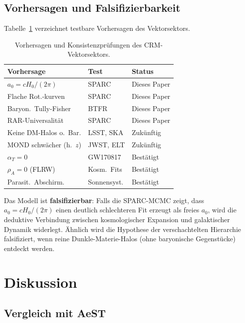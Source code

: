 \documentclass[aps,prd,twocolumn,superscriptaddress,nofootinbib]{revtex4-2}
\begin{document}
\subsection{Vorhersagen und Falsifizierbarkeit}

Tabelle~\ref{tab:predictions} verzeichnet testbare Vorhersagen des Vektorsektors.

\begin{table}[tbp]
\caption{\label{tab:predictions}Vorhersagen und Konsistenzpr\"ufungen des CRM-Vektorsektors.}
\begin{ruledtabular}
\small
\begin{tabular}{lll}
Vorhersage & Test & Status \\
\hline
$a_0 = cH_0/(2\pi)$ & SPARC & Dieses Paper \\
Flache Rot.-kurven & SPARC & Dieses Paper \\
Baryon.\ Tully-Fisher & BTFR & Dieses Paper \\
RAR-Universalit\"at & SPARC & Dieses Paper \\
Keine DM-Halos o.\ Bar. & LSST, SKA & Zuk\"unftig \\
MOND schw\"acher (h.\ $z$) & JWST, ELT & Zuk\"unftig \\
$\alpha_T = 0$ & GW170817 & Best\"atigt \\
$\rho_A = 0$ (FLRW) & Kosm.\ Fits & Best\"atigt \\
Parasit.\ Abschirm. & Sonnensyst. & Best\"atigt \\
\end{tabular}
\end{ruledtabular}
\end{table}

Das Modell ist \textbf{falsifizierbar}: Falls die SPARC-MCMC zeigt, dass $a_0 = cH_0/(2\pi)$ einen deutlich schlechteren Fit erzeugt als freies $a_0$, wird die deduktive Verbindung zwischen kosmologischer Expansion und galaktischer Dynamik widerlegt. \"Ahnlich wird die Hypothese der verschachtelten Hierarchie falsifiziert, wenn reine Dunkle-Materie-Halos (ohne baryonische Gegenst\"ucke) entdeckt werden.


\section{Diskussion}
\label{sec:discussion}

\subsection{Vergleich mit AeST}
\end{document}
